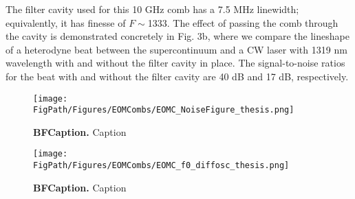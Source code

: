 The filter cavity used for this 10 GHz comb has a 7.5 MHz linewidth; equivalently, it has finesse of $F\sim$1333. The effect of passing the comb through the cavity is demonstrated concretely in Fig. 3b, where we compare the lineshape of a heterodyne beat between the supercontinuum and a CW laser with 1319 nm wavelength with and without the filter cavity in place. The signal-to-noise ratios for the beat with and without the filter cavity are 40 dB and 17 dB, respectively.


\begin{figure}[htpb]
	\begin{center}
		\texttt{[image: \\FigPath/Figures/EOMCombs/EOMC\_NoiseFigure\_thesis.png]}
	\end{center}
	\caption[Figure Title]{\textbf{BFCaption.} Caption}
	\label{fig:PPConcept}
\end{figure} 



\begin{figure}[htpb]
	\begin{center}
		\texttt{[image: \\FigPath/Figures/EOMCombs/EOMC\_f0\_diffosc\_thesis.png]}
	\end{center}
	\caption[Figure Title]{\textbf{BFCaption.} Caption}
	\label{fig:PPConcept}
\end{figure} 




